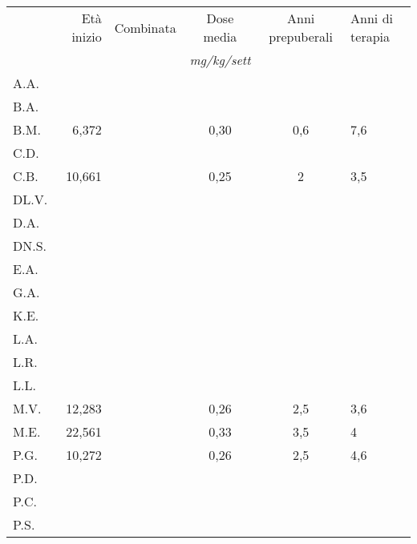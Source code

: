 \begin{table}[!h]
\begin{center}
\addtolength{\tabcolsep}{-1pt}
\renewcommand{\arraystretch}{1.1}
\begin{tabular}{lrcccl}
\toprule
 &        Età inizio & Combinata  & Dose media 	& Anni prepuberali & Anni di terapia \\
 &  &  				  & \emph{mg/kg/sett}	& & \\
\midrule
A.A.	&            & \checkmark &  		&                  &  \\
B.A.	&            &            &             &                  &  \\
B.M.	&  6,372     &            & 0,30        & 0,6              & 7,6 \\
C.D.	&            &            &             &                  &  \\
C.B.	& 10,661     & \checkmark & 0,25        & 2                & 3,5 \\
DL.V.	&            &            &             &                  &  \\
D.A.	&            &            &             &                  &  \\
DN.S.	&            &            &             &                  &  \\
E.A.	&            &            &             &                  &  \\
G.A.	&            &            &             &                  &  \\
K.E.	&            &            &             &                  &  \\
L.A.	&            &            &             &                  &  \\
L.R.	&            &            &             &                  &  \\
L.L.	&            &            &             &                  &  \\
M.V.	& 12,283     &            &  0,26       & 2,5              & 3,6 \\
M.E.	& 22,561     &            &  0,33       & 3,5              & 4 \\
P.G.	& 10,272     & \checkmark &  0,26       & 2,5              & 4,6 \\
P.D.	&            &            &             &                  &  \\
P.C.	&            &            &             &                  &  \\
P.S.	&            &            &             &                  &  \\

\end{tabular}
\end{center}
\end{table}
